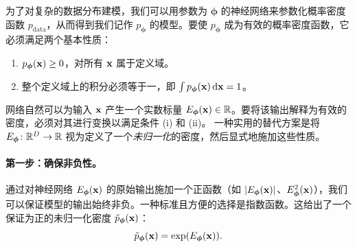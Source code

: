



为了对复杂的数据分布建模，我们可以用参数为 $\bm{\phi}$ 的神经网络来参数化概率密度函数 $p_{\mathrm{data}}$，从而得到我们记作 $p_{\bm{\phi}}$ 的模型。要使 $p_{\bm{\phi}}$ 成为有效的概率密度函数，它必须满足两个基本性质：
\begin{enumerate}
    \item[(i)] $p_{\bm{\phi}}({\mathbf{x}}) \ge 0$，对所有 ${\mathbf{x}}$ 属于定义域。
    \item[(ii)] 整个定义域上的积分必须等于一，即 $\int p_{\bm{\phi}}({\mathbf{x}}) \mathop{}\!\mathrm{d} {\mathbf{x}} = 1$。
\end{enumerate}

网络自然可以为输入 ${\mathbf{x}}$ 产生一个实数标量 $E_{{\bm{\phi}}}({\mathbf{x}}) \in \mathbb{R}$。要将该输出解释为有效的密度，必须对其进行变换以满足条件 (i) 和 (ii)。
一种实用的替代方案是将 $E_{{\bm{\phi}}}\colon\mathbb{R}^D\to\mathbb{R}$ 视为定义了一个\emph{未归一化}的密度，然后显式地施加这些性质。


\paragraph{第一步：确保非负性。}
通过对神经网络 $E_{\bm{\phi}}({\mathbf{x}})$ 的原始输出施加一个正函数（如 $\left|E_{\bm{\phi}}({\mathbf{x}})\right|$、$E^2_{\bm{\phi}}({\mathbf{x}})$），我们可以保证模型的输出始终非负。一种标准且方便的选择是指数函数。这给出了一个保证为正的未归一化密度 $\tilde{p}_{\bm{\phi}}({\mathbf{x}})$：
\[
\tilde{p}_{\bm{\phi}}({\mathbf{x}}) = \exp(E_{\bm{\phi}}({\mathbf{x}})).
\]

